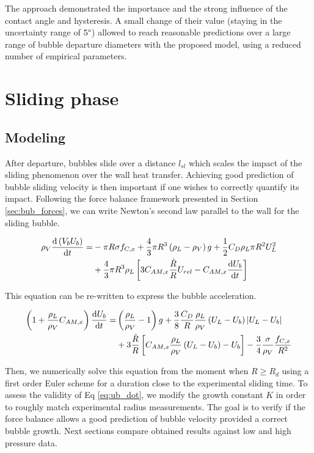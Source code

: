 The approach demonstrated the importance and the strong influence of the contact angle and hysteresis. A small change of their value (staying in the uncertainty range of $5\degree$) allowed to reach reasonable predictions over a large range of bubble departure diameters with the proposed model, using a reduced number of empirical parameters.


\section{Sliding phase}\label{sliding}
\label{sec:bub_dyn_sliding}

\subsection{Modeling}

After departure, bubbles slide over a distance $l_{sl}$ which scales the impact of the sliding phenomenon over the wall heat transfer. Achieving good prediction of bubble sliding velocity is then important if one wishes to correctly quantify its impact. Following the force balance framework presented in Section \ref{sec:bub_forces}, we can write Newton's second law parallel to the wall for the sliding bubble.


\begin{align}
\nonumber \rho_{V}\derive{\parth{V_{b}U_{b}}}{t} =& - \pi R\sigma f_{C,x}+ \frac{4}{3}\pi R^{3}\parth{\rho_{L}-\rho_{V}}g + \frac{1}{2}C_{D}\rho_{L}\pi R^{2} U_{L}^{2} \\
%
&+ \frac{4}{3}\pi R^{3}\rho_{L}\crocht{3C_{AM,x}\frac{\dot{R}}{R}U_{rel} - C_{AM,x}\derive{U_{b}}{t}}
\end{align}

This equation can be re-written to express the bubble acceleration.

\begin{align}
\nonumber \parth{1+\frac{\rho_{L}}{\rho_{V}}C_{AM,x}}\derive{U_{b}}{t} = & \parth{\frac{\rho_{L}}{\rho_{V}}-1}g + \frac{3}{8}\frac{C_{D}}{R}\frac{\rho_{L}}{\rho_{V}}\parth{U_{L}-U_{b}}\bars{U_{L}-U_{b}} \\
%
&+ 3\frac{\dot{R}}{R}\crocht{C_{AM,x}\frac{\rho_{L}}{\rho_{V}}\parth{U_{L}-U_{b}}-U_{b}} - \frac{3}{4}\frac{\sigma}{\rho_{V}}\frac{f_{C,x}}{R^{2}}
\label{eq:ub_dot}
\end{align}

Then, we numerically solve this equation from the moment when $R\geq R_{d}$ using a first order Euler scheme for a duration close to the experimental sliding time. To assess the validity of Eq \ref{eq:ub_dot}, we modify the growth constant $K$ in order to roughly match experimental radius measurements. The goal is to verify if the force balance allows a good prediction of bubble velocity provided a correct bubble growth.  Next sections compare obtained results against low and high pressure data.

